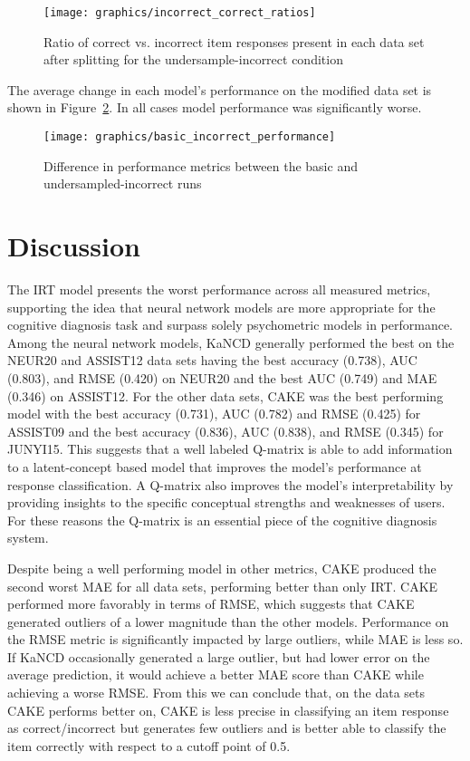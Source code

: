 \documentclass[letterpaper, 12pt, captions=tableabove]{scrreprt}
\begin{document}
			\begin{figure}[htbp]
				\centering
				\texttt{[image: graphics/incorrect\_correct\_ratios]}
				\captionsetup{justification=centering}
				\caption{Ratio of correct vs. incorrect item responses present in each data set after splitting for the undersample-incorrect condition}
				\label{fig:incorrectCorrectRatios}
			\end{figure}

			The average change in each model's performance on the modified data set is shown in Figure~\ref{fig:basicVsIncorrectPerformance}. In all cases model performance was significantly worse.

			\begin{figure}[htbp]
				\centering
				\texttt{[image: graphics/basic\_incorrect\_performance]}
				\captionsetup{justification=centering}
				\caption{Difference in performance metrics between the basic and undersampled-incorrect runs}
				\label{fig:basicVsIncorrectPerformance}
			\end{figure}

\chapter{Discussion}
\label{ch:discussion}

	The IRT model presents the worst performance across all measured metrics,  supporting the idea that neural network models are more appropriate for the cognitive diagnosis task and surpass solely psychometric models in performance. Among the neural network models, KaNCD generally performed the best on the NEUR20 and ASSIST12 data sets having the best accuracy (0.738), AUC (0.803), and RMSE (0.420) on NEUR20 and the best AUC (0.749) and MAE (0.346) on ASSIST12. For the other data sets, CAKE was the best performing model with the best accuracy (0.731), AUC (0.782) and RMSE (0.425) for ASSIST09 and the best accuracy (0.836), AUC (0.838), and RMSE (0.345) for JUNYI15. This suggests that a well labeled Q-matrix is able to add information to a latent-concept based model that improves the model's performance at response classification. A Q-matrix also improves the model's interpretability by providing insights to the specific conceptual strengths and weaknesses of users. For these reasons the Q-matrix is an essential piece of the cognitive diagnosis system. 

	Despite being a well performing model in other metrics, CAKE produced the second worst MAE for all data sets, performing better than only IRT. CAKE performed more favorably in terms of RMSE, which suggests that CAKE generated outliers of a lower magnitude than the other models. Performance on the RMSE metric is significantly  impacted by large outliers, while MAE is less so. If KaNCD occasionally generated a large outlier, but had lower error on the average prediction, it would achieve a better MAE score than CAKE while achieving a worse RMSE. From this we can conclude that, on the data sets CAKE performs better on, CAKE is less precise in classifying an item response as correct/incorrect but generates few outliers and is better able to classify the item correctly with respect to a cutoff point of 0.5.
\end{document}

